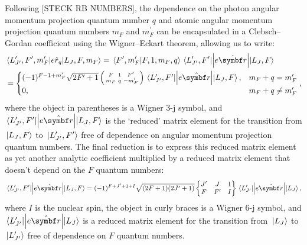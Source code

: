 Following [STECK RB NUMBERS], the dependence on the photon angular momentum projection quantum number $q$ and atomic angular momentum projection quantum numbers $m_F$ and $m_F^\prime$ can be encapsulated in a Clebsch--Gordan coefficient using the Wigner--Eckart theorem, allowing us to write:
\begin{align}
& \matrixel{L^\prime_{J^\prime}, F^\prime, m_F^\prime}{e\hat r_q}{L_J, F, m_F} = 
\braket{F^\prime, m_F^\prime}{F, 1, m_F, q}
\matrixel{L^\prime_{J^\prime}, F^\prime}{\left|e\hat{\vec r}\right|}{L_J, F}\\
&=\begin{cases}
(-1)^{F - 1 + m_F^\prime}\sqrt{2F^\prime + 1}
\left(\begin{smallmatrix}
F & 1 & F^\prime\\
m_F & q & -m_F^\prime\\
\end{smallmatrix}\right)
\matrixel{L^\prime_{J^\prime}, F^\prime}{\left|e\hat{\vec r}\right|}{L_J, F},
 & m_F + q = m_F^\prime\\
0, & m_F + q \neq m_F^\prime
\end{cases},
\end{align}
where the object in parentheses is a Wigner $3$-j symbol, and $\matrixel{L^\prime_{J^\prime}, F^\prime}{\left|e\hat{\vec r}\right|}{L_J, F}$ is the `reduced' matrix element for the transition from $\ket{L_J, F}$ to $\ket{L^\prime_{J^\prime}, F^\prime}$ free of dependence on angular momentum projection quantum numbers. The final reduction is to express this reduced matrix element as yet another analytic coefficient multiplied by a reduced matrix element that doesn't depend on the $F$ quantum numbers:
\begin{align}
\matrixel{L^\prime_{J^\prime}, F^\prime}{\left|e\hat{\vec r}\right|}{L_J, F} =
(-1)^{F + J^\prime + 1 + I}\sqrt{(2F+1)(2J^\prime+1)}
\left\{\begin{matrix}
J^\prime & J & 1\\
F & F^\prime & I
\end{matrix}\right\}
\matrixel{L^\prime_{J^\prime}}{\left|e\hat{\vec r}\right|}{L_J},
\end{align}
where $I$ is the nuclear spin, the object in curly braces is a Wigner $6$-j symbol, and $\matrixel{L^\prime_{J^\prime}}{\left|e\hat{\vec r}\right|}{L_J}$ is a reduced matrix element for the transition from $\ket{L_J}$ to $\ket{L^\prime_{J^\prime}}$ free of dependence on $F$ quantum  numbers.

